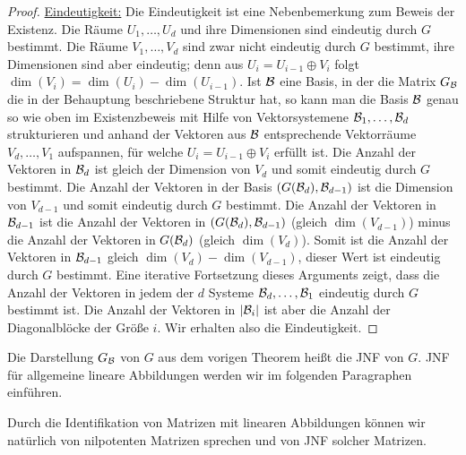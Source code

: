 \begin{proof}
	\underline{Eindeutigkeit:} Die Eindeutigkeit ist eine Nebenbemerkung zum Beweis der Existenz. Die Räume $U_1,\ldots,U_d$ und ihre Dimensionen sind eindeutig durch $G$ bestimmt. Die Räume $V_1,\ldots,V_d$ sind zwar nicht eindeutig durch $G$ bestimmt, ihre Dimensionen sind aber eindeutig; denn aus $U_i = U_{i-1} \oplus V_i$ folgt $\dim(V_i) = \dim(U_i) - \dim(U_{i-1})$. Ist $\mathcal{B}$ eine Basis, in der die Matrix $G_{\mathcal{B}}$ die in der Behauptung beschriebene Struktur hat, so kann man die Basis $\mathcal{B}$ genau so wie oben im Existenzbeweis mit Hilfe von Vektorsystemene $\mathcal{B}_1,\ldots,\mathcal{B}_d$ strukturieren und  anhand der Vektoren aus $\mathcal{B}$ entsprechende Vektorräume $V_d,\ldots,V_1$ aufspannen, für welche $U_i = U_{i-1} \oplus V_i$ erfüllt ist. Die Anzahl der Vektoren in $\mathcal{B}_d$ ist gleich der Dimension von $V_d$ und somit eindeutig durch $G$ bestimmt. Die Anzahl der Vektoren in der Basis $(G(\mathcal{B}_d),\mathcal{B}_{d-1})$ ist die Dimension von $V_{d-1}$ und somit eindeutig durch $G$ bestimmt. Die Anzahl der Vektoren in $\mathcal{B}_{d-1}$ ist die Anzahl der Vektoren in $(G(\mathcal{B}_d),\mathcal{B}_{d-1})$ (gleich $\dim(V_{d-1})$) minus die Anzahl der Vektoren in $G(\mathcal{B}_d)$ (gleich $\dim(V_d)$). Somit ist die Anzahl der Vektoren in $\mathcal{B}_{d-1}$ gleich $\dim(V_d)-\dim(V_{d-1})$, dieser Wert ist eindeutig durch $G$ bestimmt. Eine iterative Fortsetzung dieses Arguments zeigt, dass die Anzahl der Vektoren in jedem der $d$ Systeme $\mathcal{B}_d,\ldots,\mathcal{B}_1$ eindeutig durch $G$ bestimmt ist. Die Anzahl der Vektoren in $|\mathcal{B}_i|$ ist aber die Anzahl der Diagonalblöcke der Größe $i$. Wir erhalten also die Eindeutigkeit. 
\end{proof}

Die Darstellung $G_{\mathcal{B}}$ von $G$ aus dem vorigen Theorem heißt die JNF von $G$. JNF für allgemeine lineare Abbildungen werden wir im folgenden Paragraphen einführen.

Durch die Identifikation von Matrizen mit linearen Abbildungen können wir natürlich von nilpotenten Matrizen sprechen und von JNF solcher Matrizen. 

